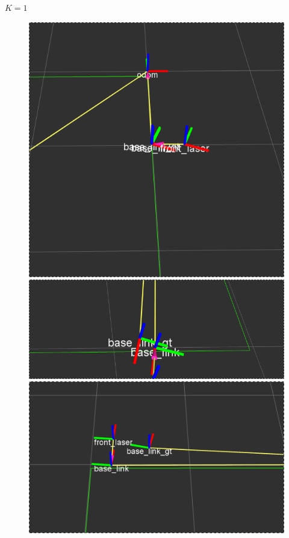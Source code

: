 $K = 1$


\begin{figure}[!htb]
  \includegraphics[width=\linewidth]{imagenesExpLazoCerrado/k1/1.png}
\endminipage\hfill
{}
  \includegraphics[width=\linewidth]{imagenesExpLazoCerrado/k1/3.png}
\endminipage\hfill
{}%
  \includegraphics[width=\linewidth]{imagenesExpLazoCerrado/k1/5.png}
\endminipage
\end{figure}

